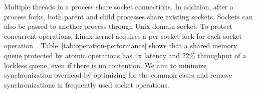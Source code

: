 Multiple threads in a process share socket connections. In addition, after a process forks, both parent and child processes share existing sockets. Sockets can also be passed to another process through Unix domain socket. To protect concurrent operations, Linux kernel acquires a per-socket lock for each socket operation~\cite{boyd2010analysis,han2012megapipe,lin2016scalable}. Table~\ref{tab:operation-performance} shows that a shared memory queue protected by atomic operations has 4x latency and 22\% throughput of a lockless queue, even if there is no contention.
We aim to minimize synchronization overhead by optimizing for the common cases and remove synchronizations in frequently used socket operations.







